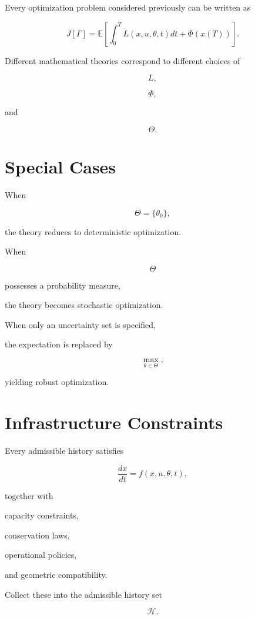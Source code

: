 \documentclass[11pt,fleqn]{book}
\numberwithin{equation}{chapter}
\theoremstyle{plain}
\theoremstyle{definition}
\theoremstyle{remark}
\begin{document}
Every optimization problem considered previously can be written as

\[
\boxed{
J[\Gamma]
=
\mathbb E
\left[
\int_0^T
L(x,u,\theta,t)
dt
+
\Phi(x(T))
\right].
}
\]

Different mathematical theories correspond to different choices of

\[
L,
\]

\[
\Phi,
\]

and

\[
\Theta.
\]


\section{Special Cases}

When

\[
\Theta
=
\{\theta_0\},
\]

the theory reduces to deterministic optimization.

When

\[
\Theta
\]

possesses a probability measure,

the theory becomes stochastic optimization.

When only an uncertainty set is specified,

the expectation is replaced by

\[
\max_{\theta\in\Theta},
\]

yielding robust optimization.


\section{Infrastructure Constraints}

Every admissible history satisfies

\[
\frac{dx}{dt}
=
f(x,u,\theta,t),
\]

together with

capacity constraints,

conservation laws,

operational policies,

and geometric compatibility.

Collect these into the admissible history set

\[
\mathcal H.
\]
\end{document}
